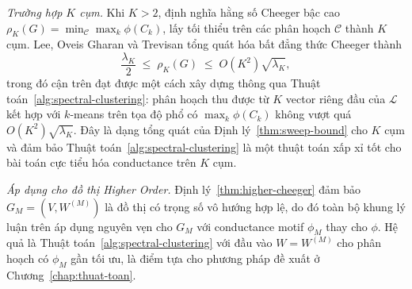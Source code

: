 \emph{Trường hợp $K$ cụm.} Khi $K > 2$, định nghĩa hằng số Cheeger bậc cao $\rho_K(G) = \min_{\mathcal{C}} \max_k \phi(C_k)$, lấy tối thiểu trên các phân hoạch $\mathcal{C}$ thành $K$ cụm. Lee, Oveis Gharan và Trevisan tổng quát hóa bất đẳng thức Cheeger thành
\[
    \frac{\lambda_K}{2} \;\leq\; \rho_K(G) \;\leq\; O(K^2) \sqrt{\lambda_K},
\]
trong đó cận trên đạt được một cách xây dựng thông qua Thuật toán~\ref{alg:spectral-clustering}: phân hoạch thu được từ $K$ vector riêng đầu của $\mathcal{L}$ kết hợp với $k$-means trên tọa độ phổ có $\max_k \phi(C_k)$ không vượt quá $O(K^2) \sqrt{\lambda_K}$. Đây là dạng tổng quát của Định lý~\ref{thm:sweep-bound} cho $K$ cụm và đảm bảo Thuật toán~\ref{alg:spectral-clustering} là một thuật toán xấp xỉ tốt cho bài toán cực tiểu hóa conductance trên $K$ cụm.

\emph{Áp dụng cho đồ thị Higher Order.} Định lý~\ref{thm:higher-cheeger} đảm bảo $G_M = (V, W^{(M)})$ là đồ thị có trọng số vô hướng hợp lệ, do đó toàn bộ khung lý luận trên áp dụng nguyên vẹn cho $G_M$ với conductance motif $\phi_M$ thay cho $\phi$. Hệ quả là Thuật toán~\ref{alg:spectral-clustering} với đầu vào $W = W^{(M)}$ cho phân hoạch có $\phi_M$ gần tối ưu, là điểm tựa cho phương pháp đề xuất ở Chương~\ref{chap:thuat-toan}.

\cleardoublepage
